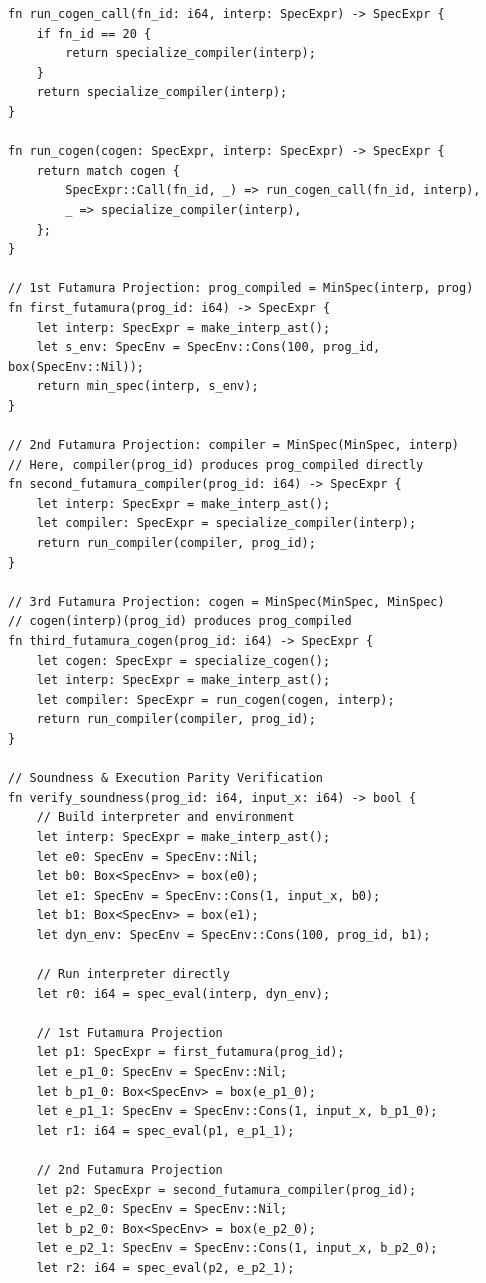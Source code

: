 \begin{lstlisting}[language=NumLang, caption={Full Annotated Source of the NumLang Self-Applicable Specializer (\texttt{src/stdlib/minspec.nl}).}, label={lst:minspec_nl_full}]
fn run_cogen_call(fn_id: i64, interp: SpecExpr) -> SpecExpr {
    if fn_id == 20 {
        return specialize_compiler(interp);
    }
    return specialize_compiler(interp);
}

fn run_cogen(cogen: SpecExpr, interp: SpecExpr) -> SpecExpr {
    return match cogen {
        SpecExpr::Call(fn_id, _) => run_cogen_call(fn_id, interp),
        _ => specialize_compiler(interp),
    };
}

// 1st Futamura Projection: prog_compiled = MinSpec(interp, prog)
fn first_futamura(prog_id: i64) -> SpecExpr {
    let interp: SpecExpr = make_interp_ast();
    let s_env: SpecEnv = SpecEnv::Cons(100, prog_id, box(SpecEnv::Nil));
    return min_spec(interp, s_env);
}

// 2nd Futamura Projection: compiler = MinSpec(MinSpec, interp)
// Here, compiler(prog_id) produces prog_compiled directly
fn second_futamura_compiler(prog_id: i64) -> SpecExpr {
    let interp: SpecExpr = make_interp_ast();
    let compiler: SpecExpr = specialize_compiler(interp);
    return run_compiler(compiler, prog_id);
}

// 3rd Futamura Projection: cogen = MinSpec(MinSpec, MinSpec)
// cogen(interp)(prog_id) produces prog_compiled
fn third_futamura_cogen(prog_id: i64) -> SpecExpr {
    let cogen: SpecExpr = specialize_cogen();
    let interp: SpecExpr = make_interp_ast();
    let compiler: SpecExpr = run_cogen(cogen, interp);
    return run_compiler(compiler, prog_id);
}

// Soundness & Execution Parity Verification
fn verify_soundness(prog_id: i64, input_x: i64) -> bool {
    // Build interpreter and environment
    let interp: SpecExpr = make_interp_ast();
    let e0: SpecEnv = SpecEnv::Nil;
    let b0: Box<SpecEnv> = box(e0);
    let e1: SpecEnv = SpecEnv::Cons(1, input_x, b0);
    let b1: Box<SpecEnv> = box(e1);
    let dyn_env: SpecEnv = SpecEnv::Cons(100, prog_id, b1);

    // Run interpreter directly
    let r0: i64 = spec_eval(interp, dyn_env);

    // 1st Futamura Projection
    let p1: SpecExpr = first_futamura(prog_id);
    let e_p1_0: SpecEnv = SpecEnv::Nil;
    let b_p1_0: Box<SpecEnv> = box(e_p1_0);
    let e_p1_1: SpecEnv = SpecEnv::Cons(1, input_x, b_p1_0);
    let r1: i64 = spec_eval(p1, e_p1_1);

    // 2nd Futamura Projection
    let p2: SpecExpr = second_futamura_compiler(prog_id);
    let e_p2_0: SpecEnv = SpecEnv::Nil;
    let b_p2_0: Box<SpecEnv> = box(e_p2_0);
    let e_p2_1: SpecEnv = SpecEnv::Cons(1, input_x, b_p2_0);
    let r2: i64 = spec_eval(p2, e_p2_1);


\end{lstlisting}
